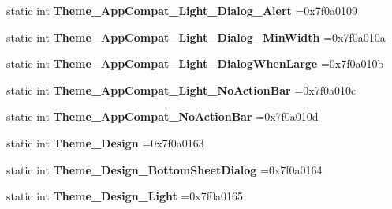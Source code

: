\begin{DoxyCompactItemize}
static int {\bfseries Theme\+\_\+\+App\+Compat\+\_\+\+Light\+\_\+\+Dialog\+\_\+\+Alert} =0x7f0a0109
\item 
\mbox{\label{classandroid_1_1support_1_1v7_1_1cardview_1_1R_1_1style_a400f621b7c5147d18623b16852a9e52a}} 
static int {\bfseries Theme\+\_\+\+App\+Compat\+\_\+\+Light\+\_\+\+Dialog\+\_\+\+Min\+Width} =0x7f0a010a
\item 
\mbox{\label{classandroid_1_1support_1_1v7_1_1cardview_1_1R_1_1style_aee964c7416b247adfc5219d0c6475e71}} 
static int {\bfseries Theme\+\_\+\+App\+Compat\+\_\+\+Light\+\_\+\+Dialog\+When\+Large} =0x7f0a010b
\item 
\mbox{\label{classandroid_1_1support_1_1v7_1_1cardview_1_1R_1_1style_ab1356a1b74e60ec05ba9f89672cb561e}} 
static int {\bfseries Theme\+\_\+\+App\+Compat\+\_\+\+Light\+\_\+\+No\+Action\+Bar} =0x7f0a010c
\item 
\mbox{\label{classandroid_1_1support_1_1v7_1_1cardview_1_1R_1_1style_ab427839144f2a839d64d5cdff26563e2}} 
static int {\bfseries Theme\+\_\+\+App\+Compat\+\_\+\+No\+Action\+Bar} =0x7f0a010d
\item 
\mbox{\label{classandroid_1_1support_1_1v7_1_1cardview_1_1R_1_1style_a67e32b50607de3d61a1680ec02dab3ed}} 
static int {\bfseries Theme\+\_\+\+Design} =0x7f0a0163
\item 
\mbox{\label{classandroid_1_1support_1_1v7_1_1cardview_1_1R_1_1style_a6e16b9d576881ce227852c61255992f0}} 
static int {\bfseries Theme\+\_\+\+Design\+\_\+\+Bottom\+Sheet\+Dialog} =0x7f0a0164
\item 
\mbox{\label{classandroid_1_1support_1_1v7_1_1cardview_1_1R_1_1style_a199fac153275a3f4a75ac295fdc32933}} 
static int {\bfseries Theme\+\_\+\+Design\+\_\+\+Light} =0x7f0a0165
\item 
\mbox{\label{classandroid_1_1support_1_1v7_1_1cardview_1_1R_1_1style_af33e7f1f2e87d2736051f8f44a081636}} 

\end{DoxyCompactItemize}
